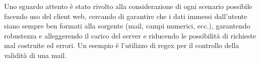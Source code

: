 Uno sguardo attento è stato rivolto alla considerazione di ogni scenario possibile facendo uso del client web, cercando di garantire che i dati immessi dall'utente siano sempre ben formati alla sorgente (mail, campi numerici, ecc.), garantendo robustezza e alleggerendo il carico del server e riducendo le possibilità di richieste mal costruite ed errori. Un esempio è l'utilizzo di regex per il controllo della validità di una mail.

\newpage